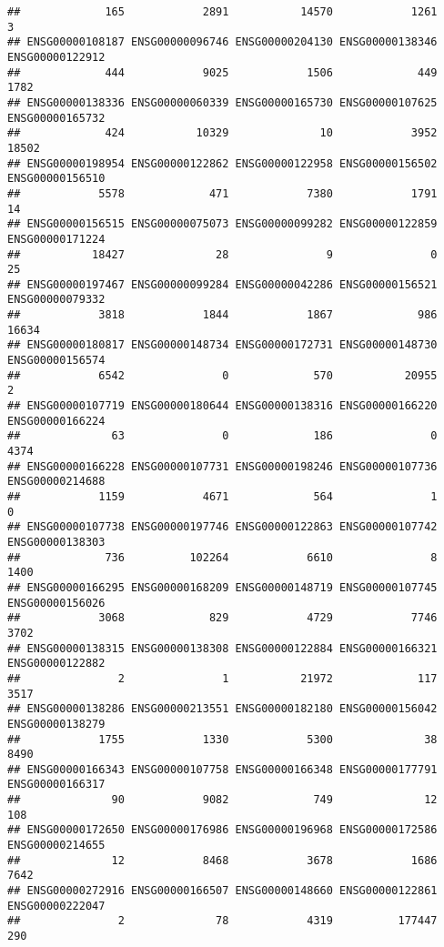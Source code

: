 \documentclass[
]{article}
\begin{document}
\begin{verbatim}
##             165            2891           14570            1261               3 
## ENSG00000108187 ENSG00000096746 ENSG00000204130 ENSG00000138346 ENSG00000122912 
##             444            9025            1506             449            1782 
## ENSG00000138336 ENSG00000060339 ENSG00000165730 ENSG00000107625 ENSG00000165732 
##             424           10329              10            3952           18502 
## ENSG00000198954 ENSG00000122862 ENSG00000122958 ENSG00000156502 ENSG00000156510 
##            5578             471            7380            1791              14 
## ENSG00000156515 ENSG00000075073 ENSG00000099282 ENSG00000122859 ENSG00000171224 
##           18427              28               9               0              25 
## ENSG00000197467 ENSG00000099284 ENSG00000042286 ENSG00000156521 ENSG00000079332 
##            3818            1844            1867             986           16634 
## ENSG00000180817 ENSG00000148734 ENSG00000172731 ENSG00000148730 ENSG00000156574 
##            6542               0             570           20955               2 
## ENSG00000107719 ENSG00000180644 ENSG00000138316 ENSG00000166220 ENSG00000166224 
##              63               0             186               0            4374 
## ENSG00000166228 ENSG00000107731 ENSG00000198246 ENSG00000107736 ENSG00000214688 
##            1159            4671             564               1               0 
## ENSG00000107738 ENSG00000197746 ENSG00000122863 ENSG00000107742 ENSG00000138303 
##             736          102264            6610               8            1400 
## ENSG00000166295 ENSG00000168209 ENSG00000148719 ENSG00000107745 ENSG00000156026 
##            3068             829            4729            7746            3702 
## ENSG00000138315 ENSG00000138308 ENSG00000122884 ENSG00000166321 ENSG00000122882 
##               2               1           21972             117            3517 
## ENSG00000138286 ENSG00000213551 ENSG00000182180 ENSG00000156042 ENSG00000138279 
##            1755            1330            5300              38            8490 
## ENSG00000166343 ENSG00000107758 ENSG00000166348 ENSG00000177791 ENSG00000166317 
##              90            9082             749              12             108 
## ENSG00000172650 ENSG00000176986 ENSG00000196968 ENSG00000172586 ENSG00000214655 
##              12            8468            3678            1686            7642 
## ENSG00000272916 ENSG00000166507 ENSG00000148660 ENSG00000122861 ENSG00000222047 
##               2              78            4319          177447             290 

\end{verbatim}
\end{document}
